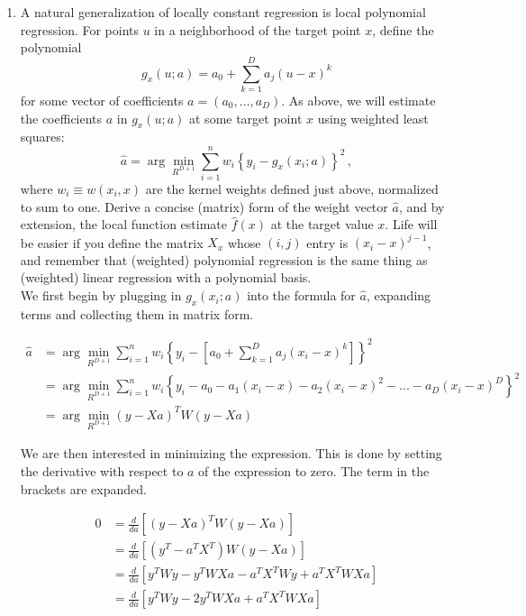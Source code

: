 \documentclass[10pt]{article}
\begin{document}
    \begin{enumerate}[label=(\Alph*)]
        \item  A natural generalization of locally constant regression is local polynomial regression.  For points $u$ in a neighborhood of the target point $x$, define the polynomial
        $$
        g_{x}(u; a) = a_0 + \sum_{k=1}^D a_j(u-x)^k 
        $$
        for some vector of coefficients $a = (a_0, \ldots, a_D)$.  As above, we will estimate the coefficients $a$ in $g_{x}(u; a)$ at some target point $x$ using weighted least squares:
        $$
        \hat{a} = \arg \min_{R^{D+1}} \sum_{i=1}^n w_i \left\{ y_i - g_{x}(x_i; a)  \right\}^2 \, ,
        $$
        where $w_i \equiv w(x_i, x)$ are the kernel weights defined just above, normalized to sum to one. Derive a concise (matrix) form of the weight vector $\hat{a}$, and by extension, the local function estimate $\hat{f}(x)$ at the target value $x$. Life will be easier if you define the matrix $X_x$ whose $(i,j)$ entry is $(x_i-x)^{j-1}$, and remember that (weighted) polynomial regression is the same thing as (weighted) linear regression with a polynomial basis.\\

        We first begin by plugging in $g_x(x_i; a)$ into the formula for $\hat{a}$, expanding terms and collecting them in matrix form.

        \begin{align*}
            \hat{a} &= \arg \min_{R^{D+1}} \sum_{i=1}^n w_i \left \{ y_i - \left [a_0 + \sum_{k=1}^D a_j (x_i - x)^k \right] \right \}^2 \\
            &= \arg \min_{R^{D+1}}\sum_{i=1}^n w_i \left \{y_i - a_0 - a_1(x_i - x) - a_2 (x_i - x)^2 - ... - a_D (x_i - x)^D \right\}^2 \\
            &= \arg \min_{R^{D+1}} (y - X a)^T W (y - X a)
        \end{align*}

        We are then interested in minimizing the expression. This is done by setting the derivative with respect to $a$ of the expression to zero. The term in the brackets are expanded.

        \begin{align*}
            0 &= \frac{d}{da} \left [ (y - X a)^T W (y - X a) \right] \\
            &= \frac{d}{da} \left[ (y^T - a^T X^T) W (y - X a) \right] \\
            &= \frac{d}{da} \left[ y^T W y - y^T W X a - a^T X^T W y + a^T X^T W X a \right] \\
            &= \frac{d}{da} \left[ y^T W y - 2 y^T W X a + a^T X^T W X a\right] \\
        \end{align*}


\end{enumerate}
\end{document}
